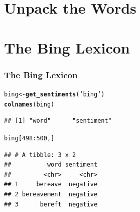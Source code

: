 \documentclass{beamer}\usepackage[]{graphicx}\usepackage[]{color}
\makeatletter
\newcommand{\hlnum}[1]{\textcolor[rgb]{0.686,0.059,0.569}{#1}}%
\newcommand{\hlstr}[1]{\textcolor[rgb]{0.192,0.494,0.8}{#1}}%
\newcommand{\hlopt}[1]{\textcolor[rgb]{0,0,0}{#1}}%
\newcommand{\hlstd}[1]{\textcolor[rgb]{0.345,0.345,0.345}{#1}}%
\newcommand{\hlkwb}[1]{\textcolor[rgb]{0.69,0.353,0.396}{#1}}%
\newcommand{\hlkwd}[1]{\textcolor[rgb]{0.737,0.353,0.396}{\textbf{#1}}}%
\newenvironment{kframe}{%
 \def\at@end@of@kframe{}%
 \ifinner\ifhmode%
  \def\at@end@of@kframe{\end{minipage}}%
  \begin{minipage}{\columnwidth}%
 \fi\fi%
 \def\FrameCommand##1{\hskip\@totalleftmargin \hskip-\fboxsep
 \colorbox{shadecolor}{##1}\hskip-\fboxsep
     \hskip-\linewidth \hskip-\@totalleftmargin \hskip\columnwidth}%
 \MakeFramed {\advance\hsize-\width
   \@totalleftmargin\z@ \linewidth\hsize
   \@setminipage}}%
 {\par\unskip\endMakeFramed%
 \at@end@of@kframe}
\newenvironment{knitrout}{}{} %
\makeatother
\begin{document}
\section{Unpack the Words}

\section{The Bing Lexicon}
\begin{frame}[fragile]
  \frametitle{The Bing Lexicon}
\begin{knitrout}
\color{fgcolor}\begin{kframe}
\begin{alltt}
  \hlstd{bing}\hlkwb{<-}\hlkwd{get_sentiments}\hlstd{(}\hlstr{'bing'}\hlstd{)}
  \hlkwd{colnames}\hlstd{(bing)}
\end{alltt}
\begin{verbatim}
## [1] "word"      "sentiment"
\end{verbatim}
\begin{alltt}
  \hlstd{bing[}\hlnum{498}\hlopt{:}\hlnum{500}\hlstd{,]}
\end{alltt}
\begin{verbatim}
## # A tibble: 3 x 2
##          word sentiment
##         <chr>     <chr>
## 1     bereave  negative
## 2 bereavement  negative
## 3      bereft  negative
\end{verbatim}
\end{kframe}
\end{knitrout}
\end{frame}
\end{document}
